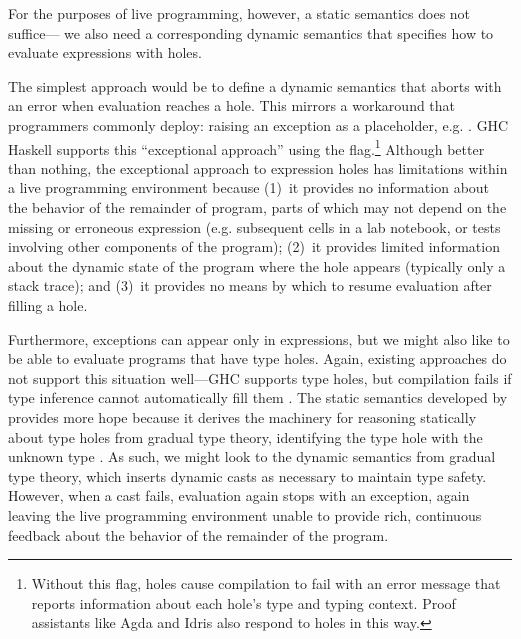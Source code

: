 %
For the purposes of live programming, however, a static semantics does not suffice---%
we also need a corresponding dynamic semantics that specifies how to evaluate expressions with holes. %
%

The simplest approach would be to define a dynamic semantics that aborts with an error when evaluation reaches a hole. 
%
This mirrors a workaround that programmers commonly deploy: 
raising an exception as a placeholder, e.g. . 
GHC Haskell supports this ``exceptional approach'' using the  flag.\footnote{
Without this flag, holes cause compilation to fail with an error message that reports information about each hole's type and typing context. 
Proof assistants like Agda \cite{norell:thesis,norell2009dependently} and Idris \cite{brady2013idris} also respond to holes in this way.
} 
Although better than nothing, the exceptional approach to expression holes has limitations 
within a live programming environment because 
(1)~it provides no information about the behavior of the remainder of program, 
parts of which may not depend on the missing or erroneous expression (e.g. subsequent cells in a lab notebook, or tests involving other components of the program);  
(2)~it provides limited information about the dynamic state of the program where the hole appears 
(typically only a stack trace);  and
(3)~it provides no means by which to resume evaluation after filling a hole.

Furthermore, exceptions can appear only in expressions, but we might also like to be able to evaluate programs that have type holes. Again, existing approaches do not support this situation well---GHC supports type holes, but compilation fails if type inference cannot automatically fill them \cite{GHCHoles}. 
The static semantics developed by \citet{popl-paper} provides more hope because it derives the machinery for 
reasoning statically about type holes from gradual type theory, 
identifying the type hole with the unknown type \cite{DBLP:conf/snapl/SiekVCB15,Siek06a}.
%
As such, we might look to the dynamic semantics from
gradual type theory, 
which inserts dynamic casts as necessary to maintain type safety. 
However, when a cast fails, evaluation again stops with 
an exception, again leaving the live programming environment unable to provide rich, continuous feedback about the behavior of the remainder of the program.

